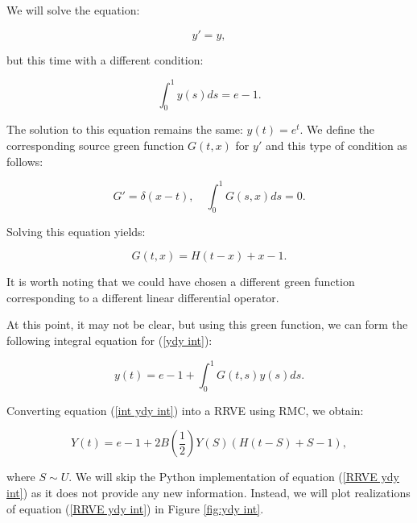 \begin{example}[$y'=y$ average condition]
    We will solve the equation:

    \begin{equation} \label{ydy int}
        y' = y,
    \end{equation}

    but this time with a different condition:

    \begin{equation}
        \int_{0}^{1} y(s) ds = e-1.
    \end{equation}

    The solution to this equation remains the same: $y(t) = e^{t}$.
    We define the corresponding source green function $G(t,x)$ for $y'$
    and this type of condition as follows:

    \begin{equation}
        G' = \delta(x-t), \quad \int_{0}^{1} G(s,x) ds = 0.
    \end{equation}

    Solving this equation yields:

    \begin{equation}
        G(t,x) = H(t-x) + x - 1.
    \end{equation}

    It is worth noting that we could have chosen a different
    green function corresponding to a different linear
    differential operator.

    At this point, it may not be clear, but using this green function,
    we can form the following integral equation for (\ref{ydy int}):

    \begin{equation} \label{int ydy int}
        y(t) = e - 1 + \int_{0}^{1} G(t,s) y(s) ds.
    \end{equation}

    Converting equation (\ref{int ydy int}) into a RRVE
    using RMC, we obtain:

    \begin{equation}\label{RRVE ydy int}
        Y(t) = e - 1 + 2B\left(\frac{1}{2}\right)Y(S)(H(t-S)+S-1),
    \end{equation}

    where $S \sim U$. We will skip the Python implementation
    of equation (\ref{RRVE ydy int}) as it does not provide any
    new information. Instead, we will plot realizations of
    equation (\ref{RRVE ydy int}) in Figure \ref{fig:ydy int}.


\end{example}
